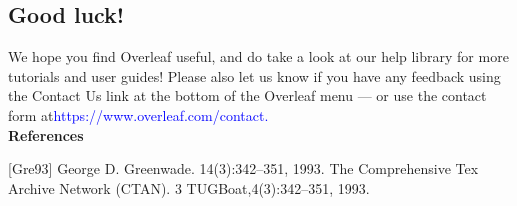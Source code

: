 \documentclass{article}
\begin{document}
	\subsection{Good luck!}
	We hope you find Overleaf useful, and do take a look at our help library for more tutorials and user
	guides! Please also let us know if you have any feedback using the Contact Us link at the bottom of
	the Overleaf menu — or use the contact form at\textcolor{blue} {https://www.overleaf.com/contact.}\\
	\vspace{0.5cm}
	\textbf{References}\vspace{0.2cm}
		
	[Gre93] George D. Greenwade.
	14(3):342–351, 1993.
	The Comprehensive Tex Archive Network (CTAN).
	3
	TUGBoat,4(3):342–351, 1993.
	
\end{document}

